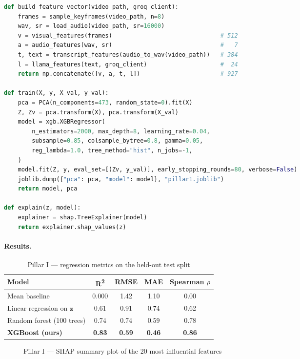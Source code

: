 \begin{lstlisting}[language=Python, caption={Pillar I --- multimodal feature extraction and XGBoost training (excerpt)}, label={lst:pillar1}]
def build_feature_vector(video_path, groq_client):
    frames = sample_keyframes(video_path, n=8)
    wav, sr = load_audio(video_path, sr=16000)
    v = visual_features(frames)                               # 512
    a = audio_features(wav, sr)                               #   7
    t, text = transcript_features(audio_to_wav(video_path))   # 384
    l = llama_features(text, groq_client)                     #  24
    return np.concatenate([v, a, t, l])                       # 927

def train(X, y, X_val, y_val):
    pca = PCA(n_components=473, random_state=0).fit(X)
    Z, Zv = pca.transform(X), pca.transform(X_val)
    model = xgb.XGBRegressor(
        n_estimators=2000, max_depth=8, learning_rate=0.04,
        subsample=0.85, colsample_bytree=0.8, gamma=0.05,
        reg_lambda=1.0, tree_method="hist", n_jobs=-1,
    )
    model.fit(Z, y, eval_set=[(Zv, y_val)], early_stopping_rounds=80, verbose=False)
    joblib.dump({"pca": pca, "model": model}, "pillar1.joblib")
    return model, pca

def explain(z, model):
    explainer = shap.TreeExplainer(model)
    return explainer.shap_values(z)
\end{lstlisting}

\paragraph{Results.}

\begin{table}[H]
\centering
\caption{Pillar I --- regression metrics on the held-out test split}
\label{tab:pillar1_metrics}
\small
\begin{tabular}{lcccc}
\toprule
Model & R\textsuperscript{2} & RMSE & MAE & Spearman $\rho$ \\
\midrule
Mean baseline                       & 0.000 & 1.42 & 1.10 & 0.00 \\
Linear regression on $\mathbf{z}$  & 0.61  & 0.91 & 0.74 & 0.62 \\
Random forest (100 trees)          & 0.74  & 0.74 & 0.59 & 0.78 \\
\textbf{XGBoost (ours)}            & \textbf{0.83} & \textbf{0.59} & \textbf{0.46} & \textbf{0.86} \\
\bottomrule
\end{tabular}
\end{table}

\begin{figure}[H]
\centering
{}
\caption{Pillar I --- SHAP summary plot of the 20 most influential features}
\label{fig:shap}
\end{figure}

